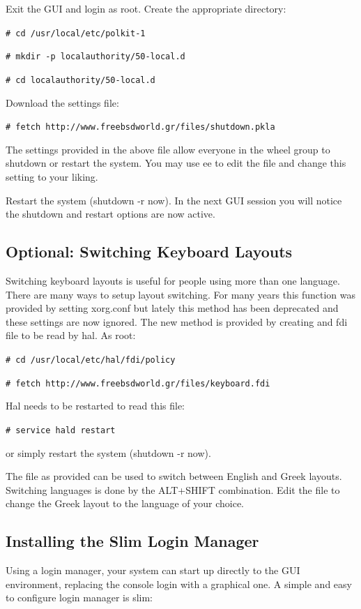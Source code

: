 \documentclass[a4paper,twoside,12pt]{article}
\newcommand{\coderoot}[1]{\texttt{\# #1}}
\begin{document}
Exit the GUI and login as root.
Create the appropriate directory:

\coderoot{cd /usr/local/etc/polkit-1}

\coderoot{mkdir -p localauthority/50-local.d}

\coderoot{cd localauthority/50-local.d}

Download the settings file:

\coderoot{fetch http://www.freebsdworld.gr/files/shutdown.pkla}

The settings provided in the above file allow everyone in the wheel group to shutdown or restart the system. You may use ee to edit the file and change this setting to your liking.

Restart the system (shutdown -r now). In the next GUI session you will notice the shutdown and restart options are now active.

\subsection{Optional: Switching Keyboard Layouts}
Switching keyboard layouts is useful for people using more than one language. There are many ways to setup layout switching. For many years this function was provided by setting xorg.conf but lately this method has been deprecated and these settings are now ignored.  The new method is provided by creating and fdi file to be read by hal. As root:

\coderoot{cd /usr/local/etc/hal/fdi/policy}

\coderoot{fetch http://www.freebsdworld.gr/files/keyboard.fdi}

Hal needs to be restarted to read this file:

\coderoot{service hald restart}

or simply restart the system (shutdown -r now).

The file as provided can be used to switch between English and Greek layouts. Switching languages is done by the ALT+SHIFT combination. Edit the file to change the Greek layout to the language of your choice.

\subsection{Installing the Slim Login Manager}
Using a login manager, your system can start up directly to the GUI environment, replacing the console login with a graphical one. A simple and easy to configure login manager is slim:
\end{document}
